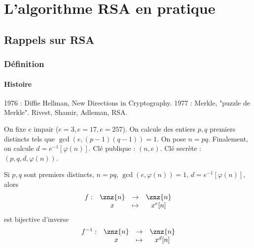 \chapter{L'algorithme RSA en pratique}
    \section{Rappels sur RSA}
        \subsection{Définition}
            \subsubsection{Histoire}
                1976 : Diffie Hellman, New Directions in Cryptography. 1977 : Merkle, "puzzle de Merkle". Rivest, Shamir, Adleman, RSA.

            On fixe $e$ impair ($e = 3, e = 17, e = 257$). On calcule des entiers $p, q$ premiers distincts tels que $\gcd (e, (p-1)(q-1)) = 1$. On pose $n = pq$. Finalement, on calcule $d = e^{-1}[\varphi(n)]$. Clé publique : $(n, e)$. Clé secrète : $(p, q, d, \varphi(n))$.
            \begin{theo}
                Si $p,q$ sont premiers distincts, $n = pq$, $\gcd (e, \varphi(n)) = 1$, $d = e^{-1}[\varphi(n)]$, alors 
                \begin{align*}
                    \begin{array}{cccc}
                        f : & \znz{n} & \to & \znz{n} \\
                        & x & \mapsto & x^e[n] \\
                    \end{array}
                \end{align*}
                est bijective d'inverse
                \begin{align*}
                    \begin{array}{cccc}
                        f^{-1} : & \znz{n} & \to & \znz{n} \\
                        & x & \mapsto & x^d[n] \\
                    \end{array}
                \end{align*}
            \end{theo}
            

